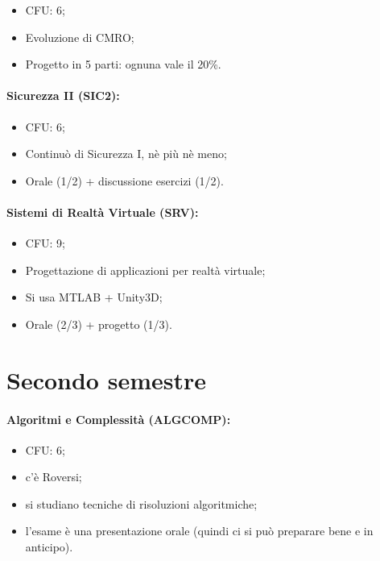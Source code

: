 \begin{itemize}
  \item CFU: 6;
  \item Evoluzione di CMRO;
  \item Progetto in 5 parti: ognuna vale il 20\%.
\end{itemize}

\paragraph{Sicurezza II (SIC2):}

\begin{itemize}
  \item CFU: 6;
    \item Continuò di Sicurezza I, nè più nè meno;
    \item Orale (1/2) +  discussione esercizi (1/2).
\end{itemize}

\paragraph{Sistemi di Realtà Virtuale (SRV):}

\begin{itemize}
  \item CFU: 9;
  \item Progettazione di applicazioni per realtà virtuale;
  \item Si usa MTLAB + Unity3D; 
  \item Orale (2/3) + progetto (1/3).
\end{itemize}

\section{Secondo semestre}

\paragraph{Algoritmi e Complessità (ALGCOMP):}

\begin{itemize}
  \item CFU: 6;
  \item c'è Roversi;
  \item si studiano tecniche di risoluzioni algoritmiche;
  \item l'esame è una presentazione orale (quindi ci si può preparare bene e in anticipo).
\end{itemize}

